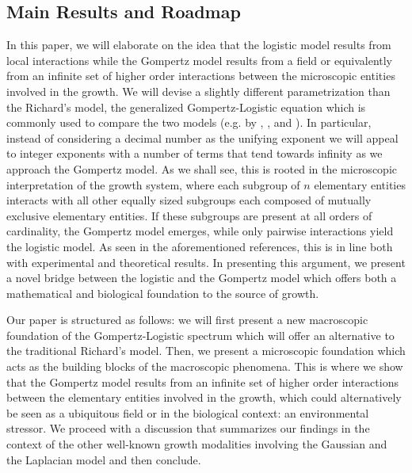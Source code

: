 \documentclass{article}
\begin{document}
\subsection{Main Results and Roadmap}
In this paper, we will elaborate on the idea that the logistic model results from local interactions while the Gompertz model results from a field or equivalently from an infinite set of higher order interactions between the microscopic entities involved in the growth. We will devise a slightly different parametrization than the Richard's model, the generalized Gompertz-Logistic equation which is commonly used to compare the two models (e.g. by \citet{petroni2020logistic}, \citet{tjorve2017use}, and \citet{wang2012richards}). In particular, instead of considering a decimal number as the unifying exponent we will appeal to integer exponents with a number of terms that tend towards infinity as we approach the Gompertz model. As we shall see, this is rooted in the microscopic interpretation of the growth system, where each subgroup of $n$ elementary entities interacts with all other equally sized subgroups each composed of mutually exclusive elementary entities. If these subgroups are present at all orders of cardinality, the Gompertz model emerges, while only pairwise interactions yield the logistic model. As seen in the aforementioned references, this is in line both with experimental and theoretical results. In presenting this argument, we present a novel bridge between the logistic and the Gompertz model which offers both a mathematical and biological foundation to the source of growth.

Our paper is structured as follows: we will first present a new macroscopic foundation of the Gompertz-Logistic spectrum which will offer an alternative to the traditional Richard's model. Then, we present a microscopic foundation which acts as the building blocks of the macroscopic phenomena. This is where we show that the Gompertz model results from an infinite set of higher order interactions between the elementary entities involved in the growth, which could alternatively be seen as a ubiquitous field or in the biological context: an environmental stressor. We proceed with a discussion that summarizes our findings in the context of the other well-known growth modalities involving the Gaussian and the Laplacian model and then conclude.



  
\end{document}
